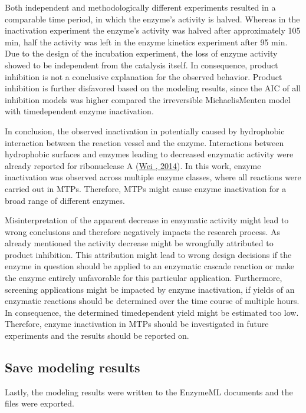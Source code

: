 \documentclass[letterpaper,12pt,english]{jupyterBook}
\begin{document}
\sphinxAtStartPar
Both independent and methodologically different experiments resulted in a comparable time period, in which the enzyme’s activity is halved. Whereas in the inactivation experiment the enzyme’s activity was halved after approximately 105 min, half the activity was left in the enzyme kinetics experiment after 95 min. Due to the design of the incubation experiment, the loss of enzyme activity showed to be independent from the catalysis itself. In consequence, product inhibition is not a conclusive explanation for the observed behavior. Product inhibition is further disfavored based on the modeling results, since the AIC of all inhibition models was higher compared the irreversible Michaelis\sphinxhyphen{}Menten model with time\sphinxhyphen{}dependent enzyme inactivation.

\sphinxAtStartPar
In conclusion, the observed inactivation in potentially caused by hydrophobic interaction between the reaction vessel and the enzyme. Interactions between hydrophobic surfaces and enzymes leading to decreased enzymatic activity were already reported for ribonuclease A (\hyperlink{cite.references:id29}{Wei , 2014}). In this work, enzyme inactivation was observed across multiple enzyme classes, where all reactions were carried out in MTPs. Therefore, MTPs might cause enzyme inactivation for a broad range of different enzymes.

\sphinxAtStartPar
Misinterpretation of the apparent decrease in enzymatic activity might lead to wrong conclusions and therefore negatively impacts the research process. As already mentioned the activity decrease might be wrongfully attributed to product inhibition. This attribution might lead to wrong design decisions if the enzyme in question should be applied to an enzymatic cascade reaction or make the enzyme entirely unfavorable for this particular application. Furthermore, screening applications might be impacted by enzyme inactivation, if yields of an enzymatic reactions should be determined over the time course of multiple hours. In consequence, the determined time\sphinxhyphen{}dependent yield might be estimated too low.
Therefore, enzyme inactivation in MTPs should be investigated in future experiments and the results should be reported on.


\subsection{Save modeling results}
\label{\detokenize{scenarios/enzyme_inactivation:save-modeling-results}}
\sphinxAtStartPar
Lastly, the modeling results were written to the EnzymeML documents and the files were exported.
\end{document}
